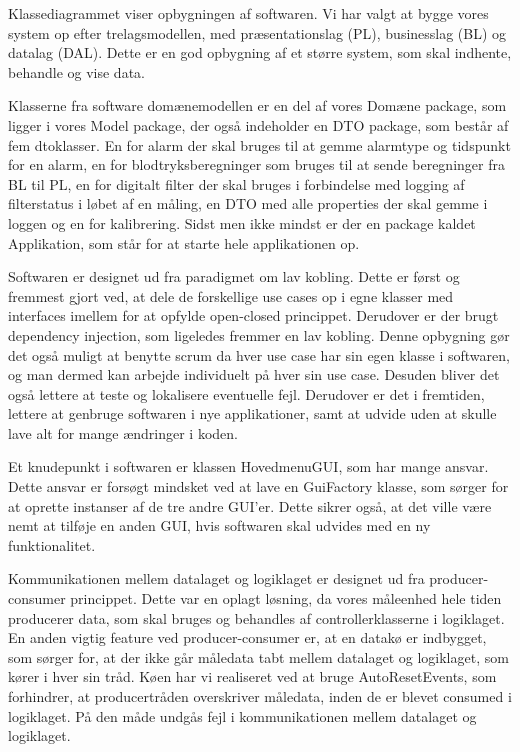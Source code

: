 Klassediagrammet viser opbygningen af softwaren. Vi har valgt at bygge vores system op efter trelagsmodellen, med præsentationslag (PL), businesslag (BL) og datalag (DAL). Dette er en god opbygning af et større system, som skal indhente, behandle og vise data. 

Klasserne fra software domænemodellen er en del af vores Domæne package, som ligger i vores Model package, der også indeholder en DTO package, som består af fem dtoklasser. En for alarm der skal bruges til at gemme alarmtype og tidspunkt for en alarm, en for blodtryksberegninger som bruges til at sende beregninger fra BL til PL, en for digitalt filter der skal bruges i forbindelse med logging af filterstatus i løbet af en måling, en DTO med alle properties der skal gemme i loggen og en for kalibrering. Sidst men ikke mindst er der en package kaldet Applikation, som står for at starte hele applikationen op. 

Softwaren er designet ud fra paradigmet om lav kobling. Dette er først og fremmest gjort ved, at dele de forskellige use cases op i egne klasser med interfaces imellem for at opfylde open-closed princippet. Derudover er der brugt dependency injection, som ligeledes fremmer en lav kobling. Denne opbygning gør det også muligt at benytte scrum  da hver use case har sin egen klasse i softwaren, og man dermed kan arbejde individuelt på hver sin use case. Desuden bliver det også lettere at teste og lokalisere eventuelle fejl. Derudover er det i fremtiden, lettere at genbruge softwaren i nye applikationer, samt at udvide uden at skulle lave alt for mange ændringer i koden. 

Et knudepunkt i softwaren er klassen HovedmenuGUI, som har mange ansvar. Dette ansvar er forsøgt mindsket ved at lave en GuiFactory klasse, som sørger for at oprette instanser af de tre andre GUI’er. Dette sikrer også, at det ville være nemt at tilføje en anden GUI, hvis softwaren skal udvides med en ny funktionalitet. 

Kommunikationen mellem datalaget og logiklaget er designet ud fra producer-consumer princippet. Dette var en oplagt løsning, da vores måleenhed hele tiden producerer data, som skal bruges og behandles af controllerklasserne i logiklaget. En anden vigtig feature ved producer-consumer er, at en datakø er indbygget, som sørger for, at der ikke går måledata tabt mellem datalaget og logiklaget, som kører i hver sin tråd. Køen har vi realiseret ved at bruge AutoResetEvents, som forhindrer, at producertråden overskriver måledata, inden de er blevet consumed i logiklaget. På den måde undgås fejl i kommunikationen mellem datalaget og logiklaget.

